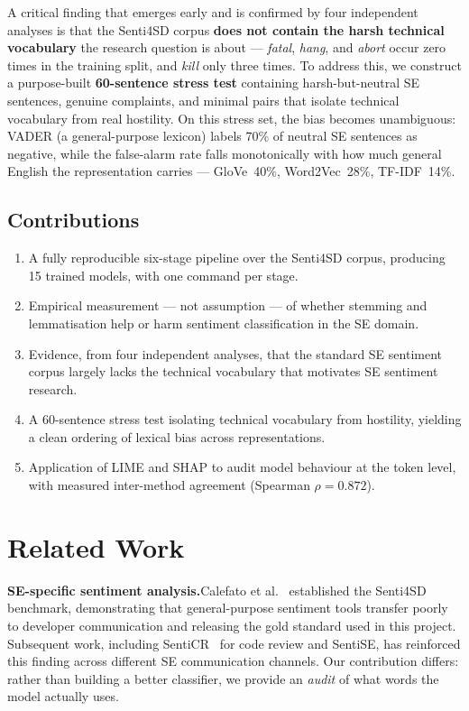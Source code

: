 \documentclass[11pt,a4paper]{article}
\begin{document}
A critical finding that emerges early and is confirmed by four independent analyses is that the Senti4SD corpus \textbf{does not contain the harsh technical vocabulary} the research question is about --- \textit{fatal}, \textit{hang}, and \textit{abort} occur zero times in the training split, and \textit{kill} only three times. To address this, we construct a purpose-built \textbf{60-sentence stress test} containing harsh-but-neutral SE sentences, genuine complaints, and minimal pairs that isolate technical vocabulary from real hostility. On this stress set, the bias becomes unambiguous: VADER (a general-purpose lexicon) labels 70\% of neutral SE sentences as negative, while the false-alarm rate falls monotonically with how much general English the representation carries --- GloVe~40\%, Word2Vec~28\%, TF-IDF~14\%.

\subsection{Contributions}

\begin{enumerate}[leftmargin=*]
    \item A fully reproducible six-stage pipeline over the Senti4SD corpus, producing 15 trained models, with one command per stage.
    \item Empirical measurement --- not assumption --- of whether stemming and lemmatisation help or harm sentiment classification in the SE domain.
    \item Evidence, from four independent analyses, that the standard SE sentiment corpus largely lacks the technical vocabulary that motivates SE sentiment research.
    \item A 60-sentence stress test isolating technical vocabulary from hostility, yielding a clean ordering of lexical bias across representations.
    \item Application of LIME and SHAP to audit model behaviour at the token level, with measured inter-method agreement (Spearman $\rho = 0.872$).
\end{enumerate}

\section{Related Work}

\textbf{SE-specific sentiment analysis.}\quad Calefato et al.~\cite{calefato2018sentiment} established the Senti4SD benchmark, demonstrating that general-purpose sentiment tools transfer poorly to developer communication and releasing the gold standard used in this project. Subsequent work, including SentiCR~\cite{ahmed2017senticr} for code review and SentiSE, has reinforced this finding across different SE communication channels. Our contribution differs: rather than building a better classifier, we provide an \textit{audit} of what words the model actually uses.
\end{document}
